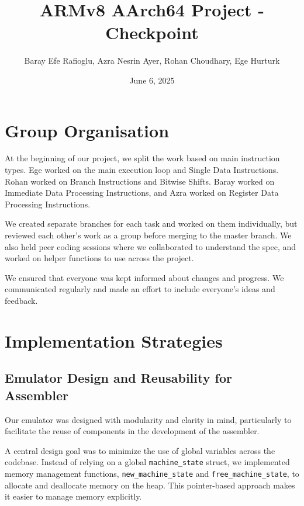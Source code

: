 \documentclass[11pt]{article}
\begin{document}
\title{ARMv8 AArch64 Project - Checkpoint}
\author{Baray Efe Rafioglu, Azra Nesrin Ayer, Rohan Choudhary, Ege Hurturk}
\date{June 6, 2025} %

\maketitle
\small

\section{Group Organisation}

At the beginning of our project, we split the work based on main instruction types. Ege worked on the main execution loop and Single Data Instructions. Rohan worked on Branch Instructions and Bitwise Shifts. Baray worked on Immediate Data Processing Instructions, and Azra worked on Register Data Processing Instructions.

We created separate branches for each task and worked on them individually, but reviewed each other’s work as a group before merging to the master branch. We also held peer coding sessions where we collaborated to understand the spec, and worked on helper functions to use across the project.

We ensured that everyone was kept informed about changes and progress. We communicated regularly and made an effort to include everyone’s ideas and feedback.

\section{Implementation Strategies}

\subsection{Emulator Design and Reusability for Assembler}

Our emulator was designed with modularity and clarity
in mind, particularly to facilitate the reuse of components in the development of the assembler.

A central design goal was to minimize the use of global variables across the codebase. Instead of relying on a global \texttt{machine\_state} struct, we implemented memory management functions, \texttt{new\_machine\_state} and \texttt{free\_machine\_state}, to allocate and deallocate memory on the heap. This pointer-based approach makes it easier to manage memory explicitly.
\end{document}
